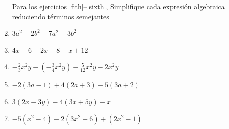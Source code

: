 \documentclass[10pt,twoside]{article}
\begin{document}
\begin{enumerate}
Para los ejercicios \ref{fith}--\ref{sixth}, Simplifique cada expresión algebraica reduciendo términos semejantes
\item $3a^{2}-2b^{2}-7a^{2}-3b^{2}$\label{fith}
\item $4x-6-2x-8+x+12$
\item $-\frac{2}{3}x^{2}y-\left(-\frac{3}{4}x^{2}y\right)-\frac{5}{12}x^{2}y-2x^{2}y$
\item $-2(3a-1)+4(2a+3)-5(3a+2)$
\item $3(2x-3y)-4(3x+5y)-x$
\item $-5(x^{2}-4)-2(3x^{2}+6)+(2x^{2}-1)$
\end{enumerate}
\end{document}
